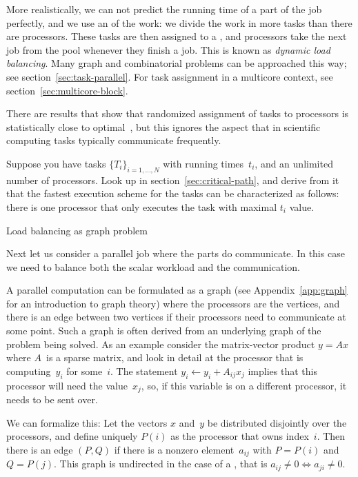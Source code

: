 More realistically, we can not predict the running time of a part of
the job perfectly, and we use an  of the
work: we divide the work in more tasks than there are
processors. These tasks are then assigned to a ,
and processors take the next job from the pool whenever they finish a
job. This is known as \emph{dynamic load
  balancing}. Many graph and
combinatorial problems can be approached this way; see
section~\ref{sec:task-parallel}. For task assignment in a multicore
context, see section~\ref{sec:multicore-block}.

There are results that show that randomized assignment of tasks to
processors is statistically close to optimal~\cite{KarpZhang88}, but
this ignores the aspect that in scientific computing tasks typically
communicate frequently.

\begin{exercise}
  Suppose you have tasks $\{T_i\}_{i=1,\ldots,N}$ with running
  times~$t_i$, and an unlimited number of processors.  Look up
   in section~\ref{sec:critical-path}, and
  derive from it that the fastest execution scheme for the tasks can
  be characterized as follows: there is one processor that
  only executes the task with maximal $t_i$ value.
\end{exercise}

 {Load balancing as graph problem}
\label{sec:graph-loadbalancing}

Next let us consider a parallel job where the parts do communicate. In
this case we need to balance both the scalar workload and the
communication.

A parallel computation can be formulated as a graph (see
Appendix~\ref{app:graph} for an introduction to graph theory) where the
processors are the vertices, and there is an edge between two vertices
if their processors need to communicate at some point. Such a graph is
often derived from an underlying graph of the problem being solved.
As an example consider the matrix-vector product $y=Ax$ where
$A$~is a sparse matrix, and look in detail at the processor that is
computing~$y_i$ for some~$i$. The statement $y_i\leftarrow y_i+A_{ij}x_j$
implies that this processor will need the value~$x_j$, so, if this
variable is on a different processor, it needs to be sent over.

We can formalize this: Let the vectors $x$ and~$y$ be distributed
disjointly over the processors, and define uniquely $P(i)$ as the
processor that owns index~$i$. Then there is an edge $(P,Q)$ if there
is a nonzero element~$a_{ij}$ with $P=P(i)$ and $Q=P(j)$. This graph
is undirected in the case of a
,
that is $a_{ij}\not=0\Leftrightarrow a_{ji}\not=0$.

